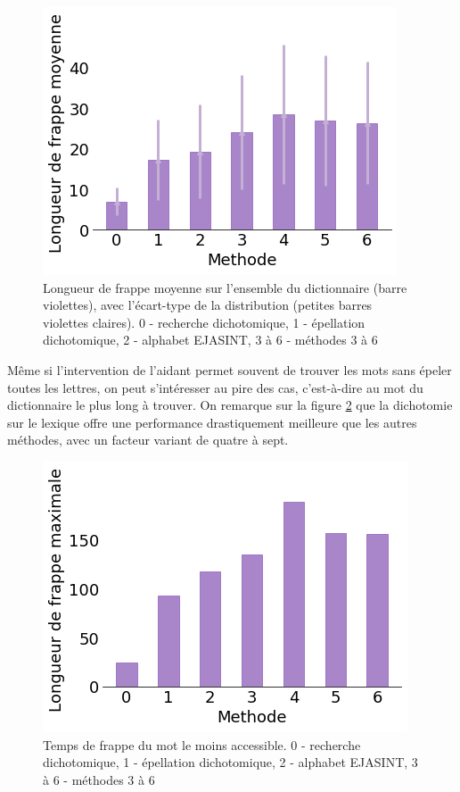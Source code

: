 \documentclass[twoside,twocolumn]{article}
\begin{document}
\begin{center}
\begin{figure}
  \includegraphics[scale=0.5]{mean.png}
  \caption{Longueur de frappe moyenne sur l'ensemble du dictionnaire (barre violettes), avec l'écart-type de la distribution (petites barres violettes claires). 0 - recherche dichotomique, 1 - épellation dichotomique, 2 - alphabet EJASINT, 3 à 6 - méthodes 3 à 6}
  \label{mean}
\end{figure}
\end{center}

Même si l'intervention de l'aidant permet souvent de trouver les mots sans épeler toutes les lettres, on peut s'intéresser au pire des cas, c'est-à-dire au mot du dictionnaire le plus long à trouver. On remarque sur la figure \ref{maxi} que la dichotomie sur le lexique offre une performance drastiquement meilleure que les autres méthodes, avec un facteur variant de quatre à sept.

\begin{center}
\begin{figure}
  \includegraphics[scale=0.5]{frappe-maxi.png}
  \caption{Temps de frappe du mot le moins accessible. 0 - recherche dichotomique, 1 - épellation dichotomique, 2 - alphabet EJASINT, 3 à 6 - méthodes 3 à 6}
  \label{maxi}
\end{figure}
\end{center}
\end{document}
